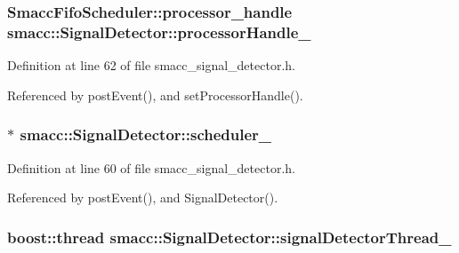 \subsubsection[{\texorpdfstring{processor\+Handle\+\_\+}{processorHandle_}}]{\setlength{\rightskip}{0pt plus 5cm}Smacc\+Fifo\+Scheduler\+::processor\+\_\+handle smacc\+::\+Signal\+Detector\+::processor\+Handle\+\_\+\hspace{0.3cm}{\ttfamily [private]}}\hypertarget{classsmacc_1_1SignalDetector_a9a77dc9f0e9f8f56dff5e76077abcb78}{}\label{classsmacc_1_1SignalDetector_a9a77dc9f0e9f8f56dff5e76077abcb78}


Definition at line 62 of file smacc\+\_\+signal\+\_\+detector.\+h.



Referenced by post\+Event(), and set\+Processor\+Handle().

\subsubsection[{\texorpdfstring{scheduler\+\_\+}{scheduler_}}]{$\ast$ smacc\+::\+Signal\+Detector\+::scheduler\+\_\+\hspace{0.3cm}{\ttfamily [private]}}\hypertarget{classsmacc_1_1SignalDetector_adaee5b9b91d0e6305dc1ab30f7ab566d}{}\label{classsmacc_1_1SignalDetector_adaee5b9b91d0e6305dc1ab30f7ab566d}


Definition at line 60 of file smacc\+\_\+signal\+\_\+detector.\+h.



Referenced by post\+Event(), and Signal\+Detector().

\subsubsection[{\texorpdfstring{signal\+Detector\+Thread\+\_\+}{signalDetectorThread_}}]{\setlength{\rightskip}{0pt plus 5cm}boost\+::thread smacc\+::\+Signal\+Detector\+::signal\+Detector\+Thread\+\_\+\hspace{0.3cm}{\ttfamily [private]}}\hypertarget{classsmacc_1_1SignalDetector_a4346a400cd37eafc5d1d2e63d975785e}{}\label{classsmacc_1_1SignalDetector_a4346a400cd37eafc5d1d2e63d975785e}


